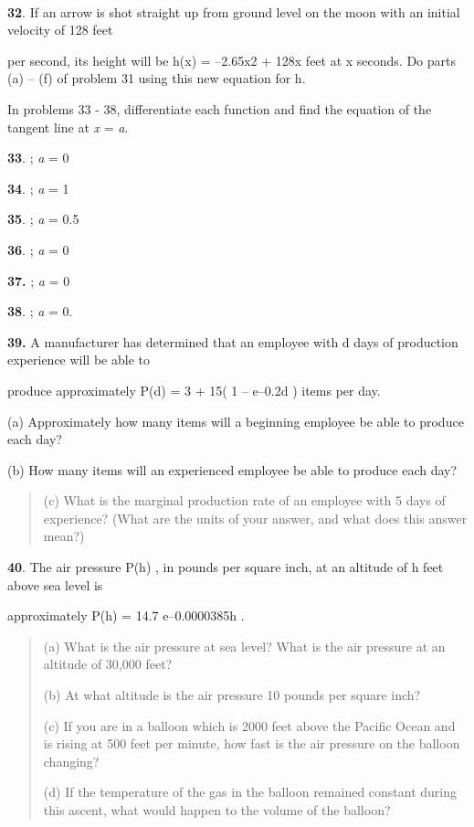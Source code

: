\textbf{\\
}

\textbf{32}. If an arrow is shot straight up from ground level on the
moon with an initial velocity of 128 feet

per second, its height will be h(x) = --2.65x2 + 128x feet at x seconds.
Do parts (a) -- (f) of problem 31 using this new equation for h.

In problems 33 - 38, differentiate each function and find the equation
of the tangent line at \emph{x} = \emph{a}.

\textbf{33}. ; \emph{a} = 0

\textbf{34}. ; \emph{a} = 1

\textbf{35}. ; \emph{a} = 0.5

\textbf{36}. ; \emph{a} = 0

\textbf{37.} ; \emph{a} = 0

\textbf{38}. ; \emph{a} = 0.

\textbf{39.} A manufacturer has determined that an employee with d days
of production experience will be able to

produce approximately P(d) = 3 + 15( 1 -- e--0.2d ) items per day.

(a) Approximately how many items will a beginning employee be able to
produce each day?

(b) How many items will an experienced employee be able to produce each
day?

\begin{quote}
(c) What is the marginal production rate of an employee with 5 days of
experience? (What are the units of your answer, and what does this
answer mean?)
\end{quote}

\textbf{40}. The air pressure P(h) , in pounds per square inch, at an
altitude of h feet above sea level is

approximately P(h) = 14.7 e--0.0000385h .

\begin{quote}
(a) What is the air pressure at sea level? What is the air pressure at
an altitude of 30,000 feet?

(b) At what altitude is the air pressure 10 pounds per square inch?

(c) If you are in a balloon which is 2000 feet above the Pacific Ocean
and is rising at 500 feet per minute, how fast is the air pressure on
the balloon changing?

(d) If the temperature of the gas in the balloon remained constant
during this ascent, what would happen to the volume of the balloon?
\end{quote}

